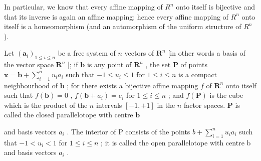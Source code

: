 In particular, we know that every affine mapping of \(R^{n}\) onto itself is bijective and that its inverse is again an affine mapping; hence every affine mapping of \(R^{n}\) onto itself is a homeomorphism (and an automorphism of the uniform structure of \(R^{n}\) ).

Let \((\pmb{a}_i)_{1\leqslant i\leqslant n}\) be a free system of \(n\) vectors of \(\mathbf{R}^n\) {[}in other words a basis of the vector space \(\mathbf{R}^n\) {]}; if \(\pmb{b}\) is any point of \(\mathbf{R}^n\) , the set \(\mathbf{P}\) of points \(\pmb{x} = \pmb{b} + \sum_{i=1}^{n} u_i a_i\) such that \(-1 \leqslant u_i \leqslant 1\) for \(1 \leqslant i \leqslant n\) is a compact neighbourhood of \(\pmb{b}\) ; for there exists a bijective affine mapping \(f\) of \(\mathbf{R}^n\) onto itself such that \(f(\pmb{b}) = 0\) , \(f(\pmb{b} + a_i) = e_i\) for \(1 \leqslant i \leqslant n\) ; and \(f(\mathbf{P})\) is the cube which is the product of the \(n\) intervals \([-1, +1]\) in the \(n\) factor spaces. \(\mathbf{P}\) is called the closed parallelotope with centre \(\pmb{b}\)

and basis vectors \(a_{i}\) . The interior of P consists of the points \(b + \sum_{i=1}^{n} u_{i} a_{i}\) such that \(-1 < u_{i} < 1\) for \(1 \leqslant i \leqslant n\) ; it is called the open parallelotope with centre b and basis vectors \(a_{i}\) .


